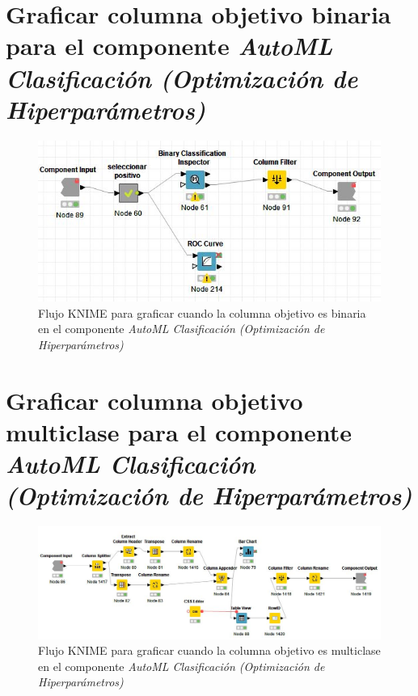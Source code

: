 \chapter{Graficar columna objetivo binaria para el componente \textit{ AutoML Clasificación (Optimización de Hiperparámetros)}}\label{aped:3}

\begin{figure}[H]
	\centering
	\includegraphics[width=\textwidth]{"figuras/anexos/2.2.2 Graficar Clase binaria"}
	\caption{Flujo KNIME para graficar cuando la columna objetivo es binaria en el componente\textit{ AutoML Clasificación (Optimización de Hiperparámetros)}}
	\label{anex:grafic-binaria}
\end{figure}


\chapter{Graficar columna objetivo multiclase para el componente \textit{ AutoML Clasificación (Optimización de Hiperparámetros)}}\label{aped:4}

\begin{figure}[H]
	\centering
	\includegraphics[width=\textwidth]{"figuras/anexos/2.2.2 Graficar Multiclase"}
		\caption{Flujo KNIME para graficar cuando la columna objetivo es multiclase en el componente\textit{ AutoML Clasificación (Optimización de Hiperparámetros)}}
	\label{anex:graf-multi}
\end{figure}

